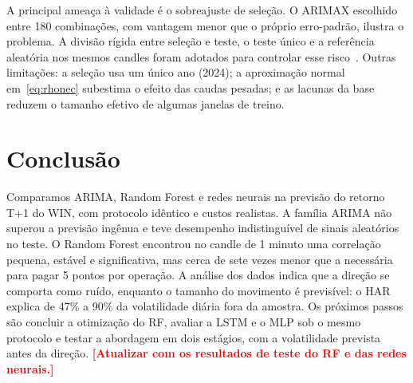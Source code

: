\documentclass[conference]{IEEEtran}
\newcommand{\pend}[1]{\textcolor{red}{\textbf{[#1]}}}
\begin{document}
A principal ameaça à validade é o sobreajuste de seleção. O ARIMAX escolhido entre 180 combinações, com vantagem menor que o próprio erro-padrão, ilustra o problema. A divisão rígida entre seleção e teste, o teste único e a referência aleatória nos mesmos candles foram adotados para controlar esse risco~\cite{bailey2014}. Outras limitações: a seleção usa um único ano (2024); a aproximação normal em~\eqref{eq:rhonec} subestima o efeito das caudas pesadas; e as lacunas da base reduzem o tamanho efetivo de algumas janelas de treino.

\section{Conclusão}

Comparamos ARIMA, Random Forest e redes neurais na previsão do retorno T+1 do WIN, com protocolo idêntico e custos realistas. A família ARIMA não superou a previsão ingênua e teve desempenho indistinguível de sinais aleatórios no teste. O Random Forest encontrou no candle de 1 minuto uma correlação pequena, estável e significativa, mas cerca de sete vezes menor que a necessária para pagar 5 pontos por operação. A análise dos dados indica que a direção se comporta como ruído, enquanto o tamanho do movimento é previsível: o HAR explica de 47\% a 90\% da volatilidade diária fora da amostra. Os próximos passos são concluir a otimização do RF, avaliar a LSTM e o MLP sob o mesmo protocolo e testar a abordagem em dois estágios, com a volatilidade prevista antes da direção. \pend{Atualizar com os resultados de teste do RF e das redes neurais.}
\end{document}
